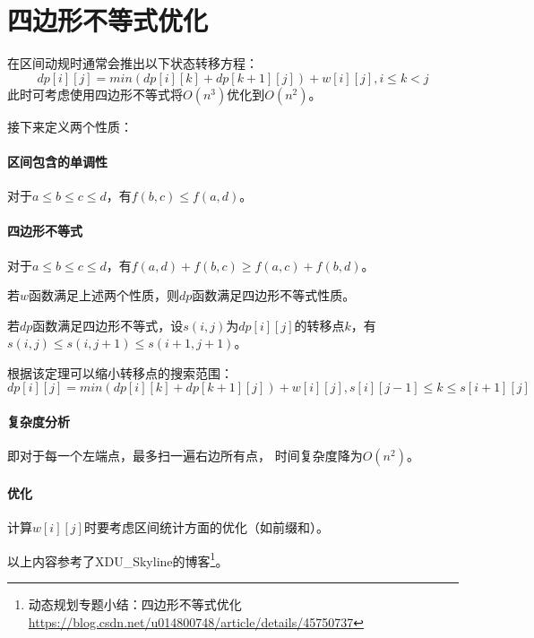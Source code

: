 \section{四边形不等式优化}
在区间动规时通常会推出以下状态转移方程：
\begin{displaymath}
    dp[i][j]=min(dp[i][k]+dp[k+1][j])+w[i][j],i\leq k <j
\end{displaymath}
此时可考虑使用四边形不等式将$O(n^3)$优化到$O(n^2)$。

接下来定义两个性质：
\paragraph{区间包含的单调性}
对于$a\leq b\leq c\leq d$，有$f(b,c)\leq f(a,d)$。
\paragraph{四边形不等式}
对于$a\leq b\leq c\leq d$，有$f(a,d)+f(b,c)\geq f(a,c)+f(b,d)$。

\begin{theorem}
    若$w$函数满足上述两个性质，则$dp$函数满足四边形不等式性质。
\end{theorem}

\begin{theorem}
    若$dp$函数满足四边形不等式，设$s(i,j)$为$dp[i][j]$的转移点$k$，有
    $s(i,j)\leq s(i,j+1)\leq s(i+1,j+1)$。
\end{theorem}

根据该定理可以缩小转移点的搜索范围：
\begin{displaymath}
    dp[i][j]=min(dp[i][k]+dp[k+1][j])+w[i][j],s[i][j-1]\leq k \leq s[i+1][j]
\end{displaymath}

\paragraph{复杂度分析} 即对于每一个左端点，最多扫一遍右边所有点，
时间复杂度降为$O(n^2)$。

\paragraph{优化} 计算$w[i][j]$时要考虑区间统计方面的优化（如前缀和）。

以上内容参考了XDU\_Skyline的博客\footnote{动态规划专题小结：四边形不等式优化
    \url{https://blog.csdn.net/u014800748/article/details/45750737}
}。
